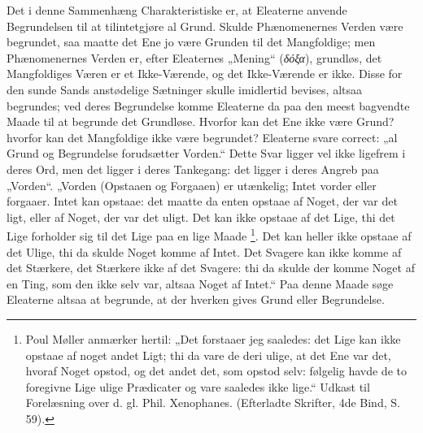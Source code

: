\documentclass[11pt]{book}
\newcommand{\opage}[1]{\marginnote{\footnotesize\textit{[#1]}}}
\begin{document}
Det i denne Sammenhæng Charakteristiske er, at Eleaterne
anvende Begrundelsen til at tilintetgjøre al Grund. Skulde
Phænomenernes Verden være begrundet, saa maatte det Ene jo
være Grunden til det Mangfoldige; men Phænomenernes
Verden er, efter Eleaternes „Mening“ (\textit{δόξα}),
grundløs, det Mangfoldiges Væren er et Ikke-Værende, og det
Ikke-Værende er ikke. Disse for den sunde Sands anstødelige
Sætninger skulle imidlertid bevises, altsaa begrundes; ved
deres Begrundelse komme Eleaterne da paa den meest
bagvendte Maade til at begrunde det Grundløse. Hvorfor kan
det Ene ikke være Grund? hvorfor kan det Mangfoldige ikke
være begrundet? Eleaterne svare correct: „al Grund og
Begrundelse forudsætter Vorden.“ Dette Svar ligger vel ikke
ligefrem i deres Ord, men det ligger i deres Tankegang: det
ligger i deres Angreb paa „Vorden“. „Vorden (Opstaaen og
Forgaaen) er utænkelig; Intet vorder eller forgaaer. Intet kan
opstaae: det maatte da enten opstaae af Noget, der var det
ligt, eller af Noget, der var det uligt. Det kan ikke opstaae
af det Lige, thi det Lige forholder sig til det Lige paa en lige
Maade%
\footnote{Poul Møller anmærker hertil: „Det forstaaer jeg
saaledes: det Lige kan ikke opstaae af noget andet Ligt; thi
da vare de deri ulige, at det Ene var det, hvoraf Noget
opstod, og det andet det, som opstod selv: følgelig havde de
to foregivne Lige ulige Prædicater og vare saaledes ikke
lige.“ Udkast til Forelæsning over d. gl. Phil. Xenophanes.
(Efterladte Skrifter, 4de Bind, S. 59).}. Det kan heller ikke
opstaae af det Ulige, thi da skulde Noget komme af Intet. Det
Svagere kan ikke komme af det Stærkere, det Stærkere ikke af
det Svagere: thi da skulde der komme Noget af en Ting, som
den ikke selv var, altsaa Noget af Intet.“ Paa denne Maade
søge
\opage{95} \setcounter{footnote}{0}%
Eleaterne altsaa at begrunde, at der hverken gives Grund
eller Begrundelse.
\end{document}
